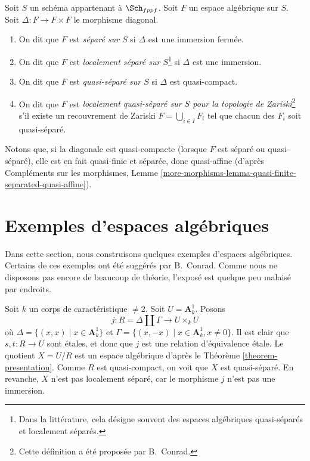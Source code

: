 \begin{definition}
\label{definition-separated}
Soit $S$ un schéma appartenant à $\Sch_{fppf}$.
Soit $F$ un espace algébrique sur $S$.
Soit $\Delta : F \to F \times F$ le morphisme diagonal.
\begin{enumerate}
\item On dit que $F$ est {\it séparé sur $S$} si $\Delta$ est une immersion fermée.
\item On dit que $F$ est {\it localement séparé sur $S$}\footnote{Dans la
littérature, cela désigne souvent des espaces algébriques quasi-séparés et
localement séparés.} si $\Delta$ est une
immersion.
\item On dit que $F$ est {\it quasi-séparé sur $S$} si $\Delta$ est quasi-compact.
\item On dit que $F$ est {\it localement quasi-séparé sur $S$ pour la topologie de Zariski}\footnote{Cette
définition a été proposée par B.\ Conrad.} s'il
existe un recouvrement de Zariski $F = \bigcup_{i \in I} F_i$ tel que
chacun des $F_i$ soit quasi-séparé.
\end{enumerate}
\end{definition}

\noindent
Notons que, si la diagonale est quasi-compacte (lorsque $F$ est séparé ou
quasi-séparé), elle est en fait
quasi-finie et séparée, donc quasi-affine (d'après Compléments sur les morphismes,
Lemme \ref{more-morphisms-lemma-quasi-finite-separated-quasi-affine}).








\section{Exemples d'espaces algébriques}
\label{section-examples}

\noindent
Dans cette section, nous construisons quelques exemples d'espaces algébriques.
Certains de ces exemples ont été suggérés par B.\ Conrad.
Comme nous ne disposons pas encore de beaucoup de théorie,
l'exposé est quelque peu malaisé par endroits.

\begin{example}
\label{example-affine-line-involution}
Soit $k$ un corps de caractéristique $\not = 2$. Soit $U = \mathbf{A}^1_k$. Posons
$$
j : R = \Delta \amalg \Gamma \longrightarrow U \times_k U
$$
où $\Delta = \{(x, x) \mid x \in \mathbf{A}^1_k\}$ et
$\Gamma = \{(x, -x) \mid x \in \mathbf{A}^1_k, x \not = 0\}$.
Il est clair que $s, t : R \to U$ sont \'etales, et donc que
$j$ est une relation d'équivalence \'etale.
Le quotient $X = U/R$ est un espace algébrique d'après le
Théorème \ref{theorem-presentation}.
Comme $R$ est quasi-compact, on voit que $X$ est quasi-séparé.
En revanche, $X$ n'est pas localement séparé, car
le morphisme $j$ n'est pas une immersion.
\end{example}

